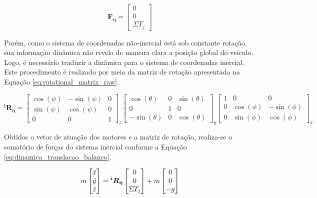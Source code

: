 \documentclass[main.tex]{subfiles}
\begin{document}
\begin{equation}\label{eq:forca_body}
    \boldsymbol{F_\eta} = \begin{bmatrix}
        0\\
        0\\
        \Sigma T_j
    \end{bmatrix}
\end{equation}

Porém, como o sistema de coordenadas não-inercial está sob constante rotação, sua informação dinâmica não revela de maneira clara a posição global do veículo. Logo, é necessário traduzir a dinâmica para o sistema de coordenadas inercial. Este procedimento é realizado por meio da matriz de rotação \cite{robotica} apresentada na Equação \ref{eq:rotational_matrix_raw}.

\begin{equation}\label{eq:rotational_matrix_raw}
    \boldsymbol{^iR_\eta} = 
     \begin{bmatrix}
        \cos(\psi)  &   -\sin(\psi) &   0\\
        \sin(\psi)  &   \cos(\psi)  &   0\\
        0           &   0           &   1
    \end{bmatrix}_z
    \begin{bmatrix}
        \cos(\theta)    &   0             &   \sin(\theta)  \\
        0               &   1               &   0           \\
        -\sin(\theta)   &   0             &   \cos(\theta)
    \end{bmatrix}_y
   \begin{bmatrix}
        1           &   0           &   0               \\
        0           &   \cos(\phi)  &   -\sin(\phi)   \\
        0           &   \sin(\phi)  &   \cos(\phi)
    \end{bmatrix}_x
\end{equation}

Obtidos o vetor de atuação dos motores e a matriz de rotação, realiza-se o somatório de forças do sistema inercial conforme a Equação \ref{eq:dinamica_translacao_balanco}.

\begin{equation}\label{eq:dinamica_translacao_balanco}
    m \begin{bmatrix}
        \Ddot{x}\\
        \Ddot{y}\\
        \Ddot{z}
    \end{bmatrix} = \boldsymbol{^iR_\eta}
    \begin{bmatrix}
        0\\
        0\\
        \Sigma T_j
    \end{bmatrix} + m
    \begin{bmatrix}
        0\\
        0\\
        -g
    \end{bmatrix}
\end{equation}
\end{document}
